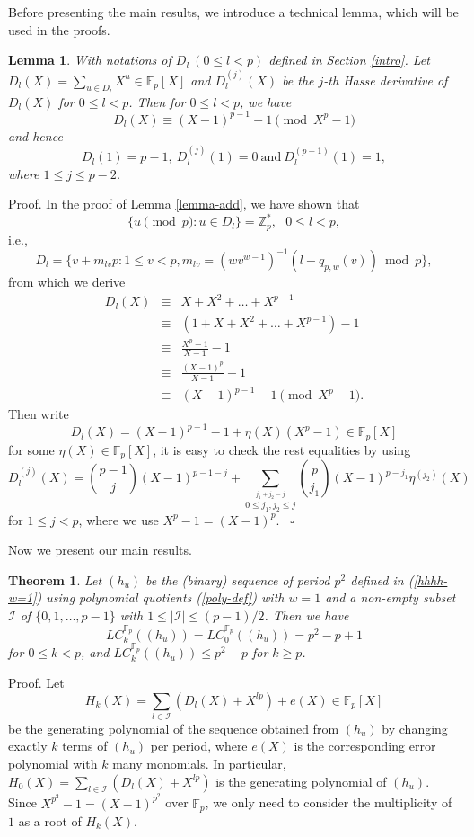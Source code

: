 \documentclass [11pt,a4paper]{article}
\def\F{\mathbb{F}}
\def\Z{\mathbb{Z}}
\newtheorem{theorem}{Theorem}
\newtheorem{lemma}{Lemma}
\begin{document}
Before presenting the main results, we introduce a technical lemma, which will be used in the proofs.

\begin{lemma}\label{D-derivative}
With notations of $D_l~(0\le l<p)$ defined in Section \ref{intro}. Let $D_l(X)= \sum\limits_{u\in D_l}X^u \in \mathbb{F}_p[X]$
and $D^{(j)}_l(X)$ be the $j$-th Hasse derivative of $D_l(X)$ for $0\le l<p$. Then for $0\le l<p$, we have
$$
D_l(X)\equiv  (X-1)^{p-1}-1 \pmod {X^p-1}
$$
and hence
$$
D_l(1)=p-1,~ D^{(j)}_l(1)=0 ~ \mathrm{and}~ D^{(p-1)}_l(1)=1,
$$
where $1\le j\le p-2$.
\end{lemma}
Proof. In the proof of Lemma \ref{lemma-add}, we have shown that
$$
\{u\pmod p: u\in D_l\}=\Z_p^*, ~~~0\leq l < p,
$$
i.e.,
$$
D_l=\{v+m_{lv}p : 1\le v<p,  m_{lv}=(wv^{w-1})^{-1}(l-q_{p,w}(v))\bmod p \},
$$
from which we derive
\begin{eqnarray*}
D_l(X)& \equiv & X+X^{2}+\ldots+X^{p-1} \\
      & \equiv & (1+X+X^{2}+\ldots+X^{p-1})-1\\
      & \equiv & \frac{X^{p}-1}{X-1}-1\\
       & \equiv & \frac{(X-1)^{p}}{X-1}-1\\
       & \equiv & (X-1)^{p-1}-1  \pmod {X^p-1}.
\end{eqnarray*}
Then write
$$
D_l(X)= (X-1)^{p-1}-1 +\eta(X)(X^p-1) \in \F_p[X]
$$
for some $\eta(X) \in \F_p[X]$, it is  easy to check the rest equalities by using
$$
D^{(j)}_l(X)=\binom{p-1}{j}(X-1)^{p-1-j}+\sum\limits_{\stackrel{j_1+j_2=j}{0\le j_1,j_2\le j}}\binom{p}{j_1}(X-1)^{p-j_1}\eta^{(j_2)}(X)
$$
for $1\leq j < p$, where we use $X^p-1=(X-1)^p$. ~\hfill $\square$


Now we present our main results.



\begin{theorem}\label{klc-p-w=1}
Let $(h_u)$ be the (binary) sequence of period $p^{2}$ defined in (\ref{hhhh-w=1}) using polynomial quotients (\ref{poly-def}) with $w=1$ and a non-empty subset $\mathcal{I}$ of $\{0,1,\ldots,p-1\}$ with $1\le |\mathcal{I}|\le (p-1)/2$.
Then we have
$$
LC^{\F_p}_k((h_u))=LC^{\F_p}_0((h_u))=p^2-p+1
$$
for $0\le k<p$, and $LC^{\F_p}_k((h_u))\le p^2-p$ for $k\ge p$.
\end{theorem}
Proof. Let
$$
H_k(X)=\sum\limits_{l\in \mathcal{I}}(D_{l}(X)+X^{lp})+e(X)\in \F_p[X]
$$
be the generating polynomial of the sequence obtained from $(h_u)$ by changing exactly $k$ terms of $(h_u)$ per period,
where $e(X)$ is the corresponding error polynomial with $k$ many  monomials. In particular, $H_0(X)=\sum\limits_{l\in \mathcal{I}}(D_{l}(X)+X^{lp})$ is the generating polynomial of $(h_u)$. Since $X^{p^2}-1=(X-1)^{p^2}$ over $\F_p$, we only need to consider the multiplicity of $1$ as a root of $H_k(X)$.
\end{document}
